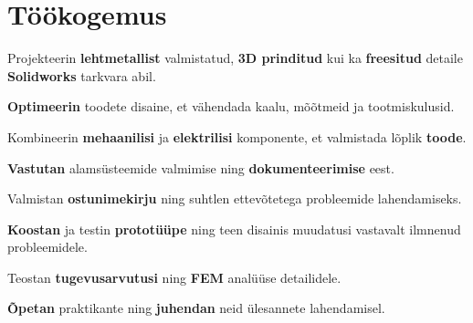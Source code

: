 \documentclass[letterpaper]{deedy-resume} %
\begin{document}
\hfill
%
%
\begin{minipage}[t]{0.66\textwidth} %


\section{Töökogemus}


\vspace{\topsep} %
\begin{tightitemize}
  \item Projekteerin \textbf{lehtmetallist} valmistatud, \textbf{3D prinditud} kui ka \textbf{freesitud} detaile \textbf{Solidworks} tarkvara abil.
  \item \textbf{Optimeerin} toodete disaine, et vähendada kaalu, mõõtmeid ja tootmiskulusid.
  \item Kombineerin \textbf{mehaanilisi} ja \textbf{elektrilisi} komponente, et valmistada lõplik \textbf{toode}.
  \item \textbf{Vastutan} alamsüsteemide valmimise ning \textbf{dokumenteerimise} eest.
  \item Valmistan \textbf{ostunimekirju} ning suhtlen ettevõtetega probleemide lahendamiseks.
  \item \textbf{Koostan} ja testin \textbf{prototüüpe} ning teen disainis muudatusi vastavalt ilmnenud probleemidele.
  \item Teostan \textbf{tugevusarvutusi} ning \textbf{FEM} analüüse detailidele.
  \item \textbf{Õpetan} praktikante ning \textbf{juhendan} neid ülesannete lahendamisel.
\end{tightitemize}


\end{minipage}
\end{document}
